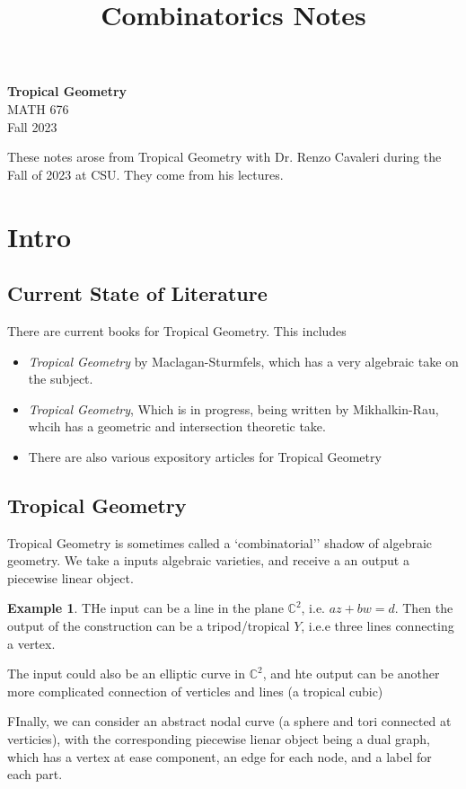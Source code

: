 \documentclass[11pt]{article}
\theoremstyle{definition}
\newtheorem{protoexample}{Example}[section]
\newenvironment{ex}
   {\begin{protoexample}}
   {\end{protoexample}}
\def\CC{{\mathbb C}}
\begin{document}
\title{Combinatorics Notes}




\thispagestyle{empty}


\begin{center}
{\LARGE \bf Tropical Geometry}\\
{\large MATH 676}\\
Fall 2023
\end{center}

These notes arose from Tropical Geometry with Dr. Renzo Cavaleri during the Fall of 2023 at CSU. They come from his lectures.



\newpage


\section{Intro}

\subsection{Current State of Literature}

There are current books for Tropical Geometry. This includes
\begin{itemize}
    \item \emph{Tropical Geometry} by Maclagan-Sturmfels, which has a very algebraic take on the subject.
    \item \emph{Tropical Geometry}, Which is in progress, being written by Mikhalkin-Rau, whcih has a geometric and intersection theoretic take.
    \item There are also various expository articles for Tropical Geometry
\end{itemize}

\subsection{Tropical Geometry}

Tropical Geometry is sometimes called a `combinatorial'' shadow of algebraic geometry. We take a inputs algebraic varieties, and receive a an output a piecewise linear object.

\begin{ex}
    THe input can be a line in the plane $\CC^2$, i.e. $az+bw=d$. Then the output of the construction can be a tripod/tropical $Y$, i.e.e three lines connecting a vertex.


    The input could also be an elliptic curve in $\CC^2$, and hte output can be another more complicated connection of verticles and lines (a tropical cubic)


    FInally, we can consider an abstract  nodal curve (a sphere and tori connected at verticies), with the corresponding piecewise lienar object being a dual graph, which has a vertex at ease component, an edge for each node, and a label for each part.
\end{ex}
\end{document}
